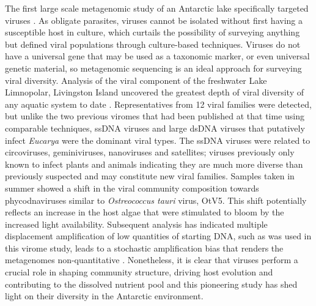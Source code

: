 The first large scale metagenomic study of an Antarctic lake specifically targeted viruses \cite{Lopez-Bueno2009}.
As obligate parasites, viruses cannot be isolated without first having a susceptible host in culture, which curtails the possibility of surveying anything but defined viral populations through culture-based techniques.
Viruses do not have a universal gene that may be used as a taxonomic marker, or even universal genetic material, so metagenomic sequencing is an ideal approach for surveying viral diversity.
Analysis of the viral component of the freshwater Lake Limnopolar, Livingston Island uncovered the greatest depth of viral diversity of any aquatic system to date \cite{Lopez-Bueno2009}.
Representatives from 12 viral families were detected, but unlike the two previous viromes that had been published at that time using comparable techniques, ss\textsc{DNA} viruses and large ds\textsc{DNA} viruses that putatively infect \emph{Eucarya} were the dominant viral types. 
The ss\textsc{DNA} viruses were related to circoviruses, geminiviruses, nanoviruses and satellites; viruses previously only known to infect plants and animals indicating they are much more diverse than previously suspected and may constitute new viral families. 
Samples taken in summer showed a shift in the viral community composition towards phycodnaviruses similar to \emph{Ostreococcus tauri} virus, OtV5. 
This shift potentially reflects an increase in the host algae that were stimulated to bloom by the increased light availability.
Subsequent analysis has indicated multiple displacement amplification of low quantities of starting \textsc{DNA}, such as was used in this virome study, leads to a stochastic amplification bias that renders the metagenomes non-quantitative \cite{Yilmaz2010}.
Nonetheless, it is clear that viruses perform a crucial role in shaping community structure, driving host evolution and contributing to the dissolved nutrient pool \cite{Danovaro2011} and this pioneering study has shed light on their diversity in the Antarctic environment.

